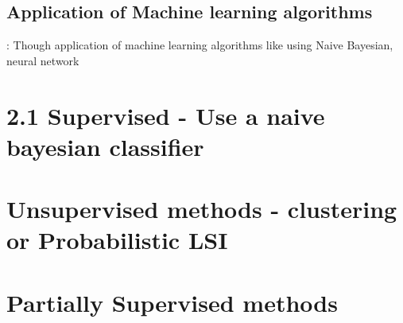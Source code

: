 \documentclass[11pt]{article}
\begin{document}
\subsection{Application of Machine learning algorithms}: 
Though application of machine learning algorithms like using Naive Bayesian,
neural network 



\section{2.1 Supervised - Use a naive bayesian classifier}
\section{Unsupervised methods - clustering or Probabilistic LSI}
\section{Partially Supervised methods}



%

\end{document}
